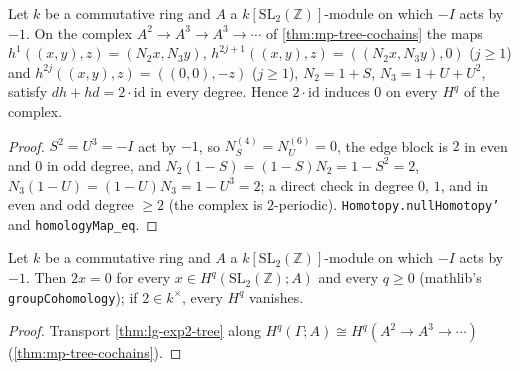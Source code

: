 \begin{theorem}\label{thm:lg-exp2-tree}
  \leanok
  Let $k$ be a commutative ring and $A$ a $k[\mathrm{SL}_2(\mathbb Z)]$-module on which $-I$ acts by $-1$.  On the complex
  $A^2\to A^3\to A^3\to\cdots$ of \ref{thm:mp-tree-cochains} the maps $h^1((x,y),z)=(N_2x,N_3y)$, $h^{2j+1}((x,y),z)=((N_2x,N_3y),0)$
  ($j\ge1$) and $h^{2j}((x,y),z)=((0,0),-z)$ ($j\ge1$), $N_2=1+S$, $N_3=1+U+U^2$, satisfy $dh+hd=2\cdot\mathrm{id}$ in every degree.  Hence
  $2\cdot\mathrm{id}$ induces $0$ on every $H^q$ of the complex.
\end{theorem}
\begin{proof}
  \leanok
  $S^2=U^3=-I$ act by $-1$, so $N_S^{(4)}=N_U^{(6)}=0$, the edge block is $2$ in even and $0$ in odd degree, and
  $N_2(1-S)=(1-S)N_2=1-S^2=2$, $N_3(1-U)=(1-U)N_3=1-U^3=2$; a direct check in degree $0$, $1$, and in even and odd degree $\ge2$
  (the complex is $2$-periodic).  \texttt{Homotopy.nullHomotopy'} and \texttt{homologyMap\_eq}.
\end{proof}

\begin{theorem}[Theorem O(1): $2\cdot H^q(\mathrm{SL}_2(\mathbb Z);A)=0$ when $-I$ acts by $-1$]\label{thm:lg-exp2}
  \leanok
  Let $k$ be a commutative ring and $A$ a $k[\mathrm{SL}_2(\mathbb Z)]$-module on which $-I$ acts by $-1$.  Then $2x=0$ for every
  $x\in H^q(\mathrm{SL}_2(\mathbb Z);A)$ and every $q\ge0$ (mathlib's \texttt{groupCohomology}); if $2\in k^\times$, every $H^q$ vanishes.
\end{theorem}
\begin{proof}
  \leanok
  Transport \ref{thm:lg-exp2-tree} along $H^q(\Gamma;A)\cong H^q(A^2\to A^3\to\cdots)$ (\ref{thm:mp-tree-cochains}).
\end{proof}


